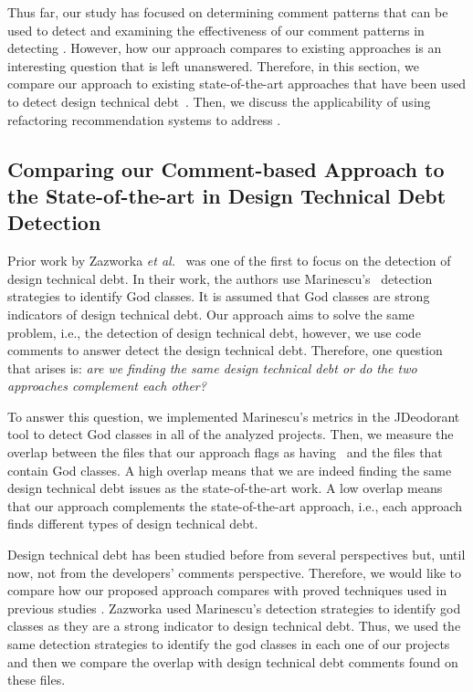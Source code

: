 Thus far, our study has focused on determining comment patterns that can be used to detect \SADTD and examining the effectiveness of our comment patterns in detecting \SADTD. However, how our approach compares to existing approaches is an interesting question that is left unanswered. Therefore, in this section, we compare our approach to existing state-of-the-art approaches that have been used to detect design technical debt~\cite{Zazworka2011MTD}. Then, we discuss the applicability of using refactoring recommendation systems to address \SADTD. 

\subsection{Comparing our Comment-based Approach to the State-of-the-art in Design Technical Debt Detection}

Prior work by Zazworka \emph{et al.}~\cite{Zazworka2011MTD} was one of the first to focus on the detection of design technical debt. In their work, the authors use Marinescu's~\cite{Marinescu2004ICSM} detection strategies to identify God classes. It is assumed that God classes are strong indicators of design technical debt. Our approach aims to solve the same problem, i.e., the detection of design technical debt, however, we use code comments to answer detect the design technical debt. Therefore, one question that arises is: \emph{are we finding the same design technical debt or do the two approaches complement each other?} 

To answer this question, we implemented Marinescu's metrics in the JDeodorant tool to detect God classes in all of the analyzed projects. Then, we measure the overlap between the files that our approach flags as having \SADTD~and the files that contain God classes. A high overlap means that we are indeed finding the same design technical debt issues as the state-of-the-art work. A low overlap means that our approach complements the state-of-the-art approach, i.e., each approach finds different types of design technical debt.

Design technical debt has been studied before from several perspectives but, until now, not from the developers' comments perspective. Therefore, we would like to compare how our proposed approach compares with proved techniques used in previous studies \cite{Zazworka2011MTD}. Zazworka used Marinescu's \cite{Marinescu2004ICSM} detection strategies to identify god classes as they are a strong indicator to design technical debt. Thus, we used the same detection strategies to identify the god classes in each one of our projects and then we  compare the overlap with design technical debt comments found on these files.


